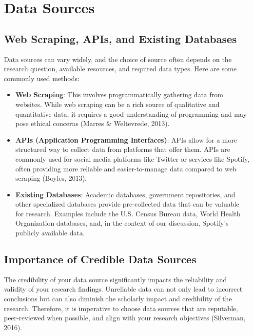 \documentclass[
  b5paper]{book}
\begin{document}
\hypertarget{data-sources-1}{%
\section{Data Sources}\label{data-sources-1}}

\hypertarget{web-scraping-apis-and-existing-databases}{%
\subsection{Web Scraping, APIs, and Existing Databases}\label{web-scraping-apis-and-existing-databases}}

Data sources can vary widely, and the choice of source often depends on the research question, available resources, and required data types. Here are some commonly used methods:

\begin{itemize}
\item
  \textbf{Web Scraping}: This involves programmatically gathering data from websites. While web scraping can be a rich source of qualitative and quantitative data, it requires a good understanding of programming and may pose ethical concerns (Marres \& Weltevrede, 2013).
\item
  \textbf{APIs (Application Programming Interfaces)}: APIs allow for a more structured way to collect data from platforms that offer them. APIs are commonly used for social media platforms like Twitter or services like Spotify, often providing more reliable and easier-to-manage data compared to web scraping (Boyles, 2013).
\item
  \textbf{Existing Databases}: Academic databases, government repositories, and other specialized databases provide pre-collected data that can be valuable for research. Examples include the U.S. Census Bureau data, World Health Organization databases, and, in the context of our discussion, Spotify's publicly available data.
\end{itemize}

\hypertarget{importance-of-credible-data-sources}{%
\subsection{Importance of Credible Data Sources}\label{importance-of-credible-data-sources}}

The credibility of your data source significantly impacts the reliability and validity of your research findings. Unreliable data can not only lead to incorrect conclusions but can also diminish the scholarly impact and credibility of the research. Therefore, it is imperative to choose data sources that are reputable, peer-reviewed when possible, and align with your research objectives (Silverman, 2016).
\end{document}
